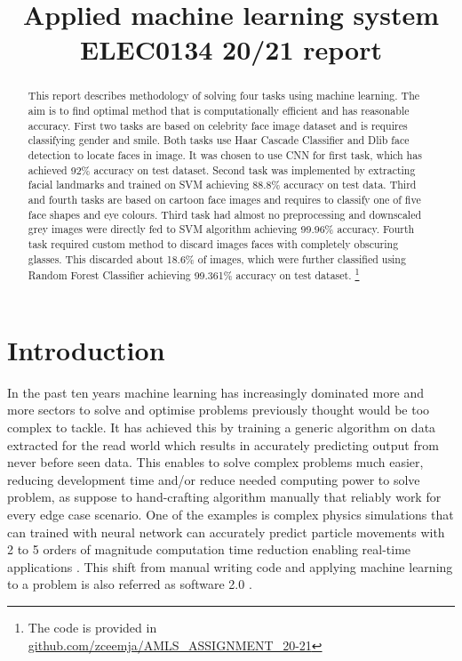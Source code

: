 \documentclass{article}
\title{Applied machine learning system ELEC0134 20/21 report}
\begin{document}
\maketitle

\begin{abstract}

This report describes methodology of solving four tasks using machine learning. The aim is to find optimal method that is computationally efficient and has reasonable accuracy. First two tasks are based on celebrity face image dataset and is requires classifying gender and smile. Both tasks use Haar Cascade Classifier and Dlib face detection to locate faces in image. It was chosen to use CNN for first task, which has achieved 92\% accuracy on test dataset. Second task was implemented by extracting facial landmarks and trained on SVM achieving 88.8\% accuracy on test data.  Third and fourth tasks are based on cartoon face images and requires to classify one of five face shapes and eye colours. Third task had almost no preprocessing and downscaled grey images were directly fed to SVM algorithm achieving 99.96\% accuracy. Fourth task required custom method to discard images faces with completely obscuring glasses. This discarded about 18.6\% of images, which were further classified using Random Forest Classifier achieving 99.361\% accuracy on test dataset. \footnote{The code is provided in\\ \href{https://github.com/zceemja/AMLS_ASSIGNMENT_20-21}{github.com/zceemja/AMLS\_ASSIGNMENT\_20-21}}
\end{abstract}

\section{Introduction}
\label{sec:intro}

In the past ten years machine learning has increasingly dominated more and more sectors to solve and optimise problems previously thought would be too complex to tackle. It has achieved this by training a generic algorithm on data extracted for the read world which results in accurately predicting output from never before seen data. This enables to solve complex problems much easier, reducing development time and/or reduce needed computing power to solve problem, as suppose to hand-crafting algorithm manually that reliably work for every edge case scenario. One of the examples is complex physics simulations that can trained with neural network can accurately predict particle movements with 2 to 5 orders of magnitude computation time reduction enabling real-time applications \cite{Zsolnai13fc,physics}. This shift from manual writing code and applying machine learning to a problem is also referred as software 2.0 \cite{software2}. 
\end{document}
